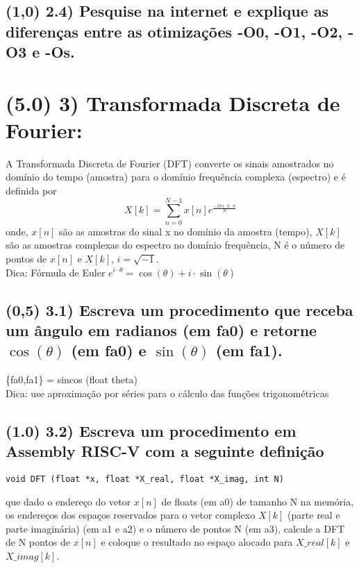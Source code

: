 \documentclass{article}
\begin{document}
\subsection*{(1,0) 2.4) Pesquise na internet e explique as diferenças entre as otimizações -O0, -O1, -O2, -O3 e -Os.}

\newpage

\section*{(5.0) 3) Transformada Discreta de Fourier:}
A Transformada Discreta de Fourier (DFT) converte os sinais amostrados no domínio do tempo (amostra) para o domínio frequência complexa (espectro) e é definida por
$$ X[k]=\sum_{n=0}^{N-1}x[n]e^{\frac{-2\pi i \cdot k \cdot n}{N}} $$
onde, $x[n]$ são as amostras do sinal x no domínio da amostra (tempo), $X[k]$ são as amostras complexas do espectro no domínio frequência, N é o número de pontos de $x[n]$ e $X[k]$, $i=\sqrt{-1}$. \\
Dica: Fórmula de Euler $e^{i \cdot \theta}=\cos(\theta)+i \cdot \sin(\theta)$

\subsection*{(0,5) 3.1) Escreva um procedimento que receba um ângulo em radianos (em fa0) e retorne $\cos(\theta)$ (em fa0) e $\sin(\theta)$ (em fa1).}
\{fa0,fa1\} = sincos (float theta) \\
Dica: use aproximação por séries para o cálculo das funções trigonométricas

\subsection*{(1.0) 3.2) Escreva um procedimento em Assembly RISC-V com a seguinte definição}
\begin{verbatim}
void DFT (float *x, float *X_real, float *X_imag, int N)
\end{verbatim}
que dado o endereço do vetor $x[n]$ de floats (em a0) de tamanho N na memória, os endereços dos espaços reservados para o vetor complexo $X[k]$ (parte real e parte imaginária) (em a1 e a2) e o número de pontos N (em a3), calcule a DFT de N pontos de $x[n]$ e coloque o resultado no espaço alocado para $X\_real[k]$ e $X\_imag[k]$.
\end{document}
